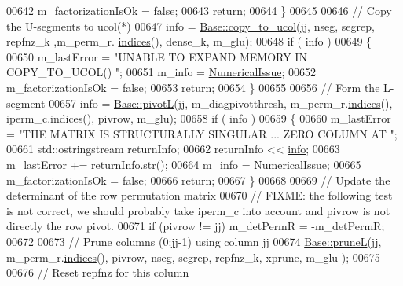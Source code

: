 \begin{DoxyCode}
00642         m\_factorizationIsOk = \textcolor{keyword}{false}; 
00643         \textcolor{keywordflow}{return}; 
00644       \}
00645       
00646       \textcolor{comment}{// Copy the U-segments to ucol(*)}
00647       info = \hyperlink{group___sparse_l_u___module_ae4867ed1d5f104f9245411c356416a21}{Base::copy\_to\_ucol}(jj, nseg, segrep, repfnz\_k ,m\_perm\_r.
      \hyperlink{group___core___module_a2f1ab379207fcd1ceb33941e25cf50c2}{indices}(), dense\_k, m\_glu); 
00648       \textcolor{keywordflow}{if} ( info ) 
00649       \{
00650         m\_lastError = \textcolor{stringliteral}{"UNABLE TO EXPAND MEMORY IN COPY\_TO\_UCOL() "};
00651         m\_info = \hyperlink{group__enums_gga85fad7b87587764e5cf6b513a9e0ee5eaaf9b736d310a664e7729d163a035cc5f}{NumericalIssue}; 
00652         m\_factorizationIsOk = \textcolor{keyword}{false}; 
00653         \textcolor{keywordflow}{return}; 
00654       \}
00655       
00656       \textcolor{comment}{// Form the L-segment }
00657       info = \hyperlink{group___sparse_l_u___module_ab5f56947465b829f8d523575724c3ac6}{Base::pivotL}(jj, m\_diagpivotthresh, m\_perm\_r.\hyperlink{group___core___module_a2f1ab379207fcd1ceb33941e25cf50c2}{indices}(), iperm\_c.indices(), 
      pivrow, m\_glu);
00658       \textcolor{keywordflow}{if} ( info ) 
00659       \{
00660         m\_lastError = \textcolor{stringliteral}{"THE MATRIX IS STRUCTURALLY SINGULAR ... ZERO COLUMN AT "};
00661         std::ostringstream returnInfo;
00662         returnInfo << \hyperlink{group___sparse_l_u___module_ab0d0c1744ffd5a1dff578a44bcef2a3d}{info}; 
00663         m\_lastError += returnInfo.str();
00664         m\_info = \hyperlink{group__enums_gga85fad7b87587764e5cf6b513a9e0ee5eaaf9b736d310a664e7729d163a035cc5f}{NumericalIssue}; 
00665         m\_factorizationIsOk = \textcolor{keyword}{false}; 
00666         \textcolor{keywordflow}{return}; 
00667       \}
00668       
00669       \textcolor{comment}{// Update the determinant of the row permutation matrix}
00670       \textcolor{comment}{// FIXME: the following test is not correct, we should probably take iperm\_c into account and pivrow
       is not directly the row pivot.}
00671       \textcolor{keywordflow}{if} (pivrow != jj) m\_detPermR = -m\_detPermR;
00672 
00673       \textcolor{comment}{// Prune columns (0:jj-1) using column jj}
00674       \hyperlink{group___sparse_l_u___module_a350464d1c83182fbd7da8a5a74bdfde8}{Base::pruneL}(jj, m\_perm\_r.\hyperlink{group___core___module_a2f1ab379207fcd1ceb33941e25cf50c2}{indices}(), pivrow, nseg, segrep, repfnz\_k, xprune, m\_glu
      ); 
00675       
00676       \textcolor{comment}{// Reset repfnz for this column }

\end{DoxyCode}
